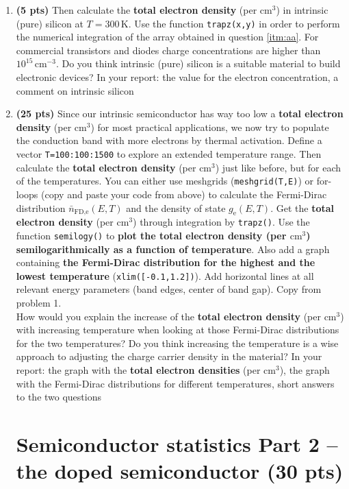 \documentclass[11pt]{article}
\begin{document}
\begin{enumerate}[resume]
\item \textbf{(5 pts)} Then calculate the {\bf total electron density} (per  $\mathrm{cm^3}$) in intrinsic (pure) silicon at $T=300\,\mathrm{K}$. Use the function \verb|trapz(x,y)| in order to perform the numerical integration of the array obtained in question \ref{itm:aa}. For commercial transistors and diodes charge concentrations are higher than $10^{15}\,\mathrm{cm^{-3}}$. Do you think intrinsic (pure) silicon is a suitable material to build electronic devices? {\color{red}In your report: the value for the electron concentration, a comment on intrinsic silicon}

\item \label{itm:tempdep}\textbf{(25 pts)} Since our intrinsic semiconductor has way too low a {\bf total electron density} (per  $\mathrm{cm^3}$) for most practical applications, we now try to populate the conduction band with more electrons by thermal activation. Define a vector \verb|T=100:100:1500| to explore an extended temperature range. Then calculate the {\bf total electron density} (per  $\mathrm{cm^3}$) just like before, but for each of the temperatures. You can either use meshgrids (\verb|meshgrid(T,E)|) or for-loops (copy and paste your code from above) to calculate the Fermi-Dirac distribution $\bar {n}_\text{FD,e}(E,T)$ and the density of state $g_\text{e}(E,T)$. Get the {\bf total electron density} (per  $\mathrm{cm^3}$) through integration by \verb|trapz()|. Use the function \verb|semilogy()| to {\bf plot the {\bf total electron density} (per  $\mathrm{cm^3}$) semilogarithmically as a function of temperature}. Also add a graph containing {\bf the Fermi-Dirac distribution for the highest and the lowest temperature} (\verb|xlim([-0.1,1.2])|). Add horizontal lines at all relevant energy parameters (band edges, center of band gap). Copy from problem 1.\\
How would you explain the increase of the {\bf total electron density} (per  $\mathrm{cm^3}$) with increasing temperature when looking at those Fermi-Dirac distributions for the two temperatures? Do you think increasing the temperature is a wise approach to adjusting the charge carrier density in the material? {\color{red}In your report: the graph with the {\bf total electron densities} (per  $\mathrm{cm^3}$), the graph with the Fermi-Dirac distributions for different temperatures, short answers to the two questions}

\section*{Semiconductor statistics Part 2 -- the doped semiconductor (30 pts)}
\label{sec:lot}


\end{enumerate}
\end{document}
